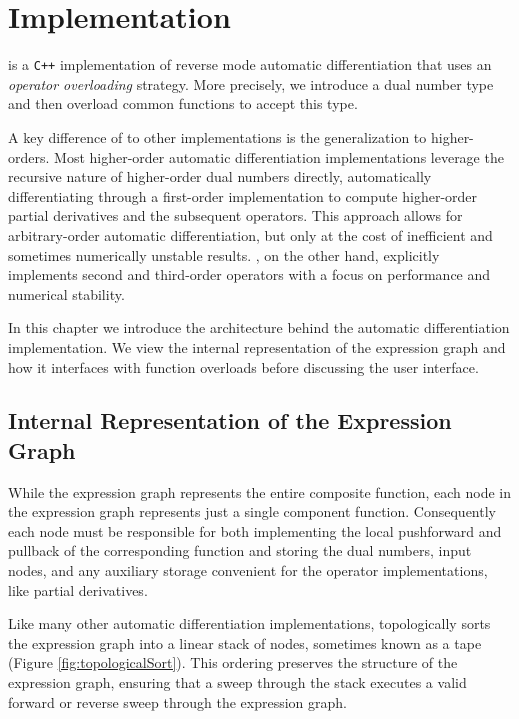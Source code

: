 \chapter{Implementation}

\nomad is a \verb|C++| implementation of reverse mode automatic
differentiation that uses an \textit{operator overloading} strategy.
More precisely, we introduce a dual number type and then overload
common functions to accept this type.

A key difference of \nomad to other implementations is the generalization
to higher-orders.  Most higher-order automatic differentiation
implementations leverage the recursive nature of higher-order dual
numbers directly, automatically differentiating through a first-order
implementation to compute higher-order partial derivatives and
the subsequent operators.  This approach allows for
arbitrary-order automatic differentiation, but only at the cost of
inefficient and sometimes numerically unstable results.  \nomad,
on the other hand, explicitly implements second and third-order operators
with a focus on performance and numerical stability.

In this chapter we introduce the architecture behind the \nomad automatic 
differentiation implementation.  We view the internal representation of the 
expression graph and how it interfaces with function overloads before
discussing the user interface.

\section{Internal Representation of the Expression Graph}

While the expression graph represents the entire composite function, each
node in the expression graph represents just a single component function.  
Consequently each node must be responsible for both implementing the 
local pushforward and pullback of the corresponding function and storing 
the dual numbers, input nodes, and any auxiliary storage convenient for 
the operator implementations, like partial derivatives.
 
Like many other automatic differentiation implementations, \nomad
topologically sorts the expression graph into a linear stack of nodes, 
sometimes known as a tape (Figure \ref{fig:topologicalSort}).  This ordering 
preserves the structure of the expression graph, ensuring that a sweep 
through the stack executes a valid forward or reverse sweep through the 
expression graph.


